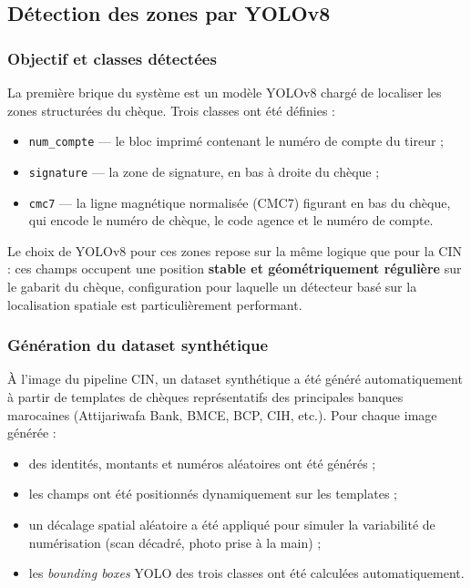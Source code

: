 \subsection*{Détection des zones par YOLOv8}

\subsubsection{Objectif et classes détectées}

La première brique du système est un modèle YOLOv8 chargé de localiser les
zones structurées du chèque. Trois classes ont été définies :

\begin{itemize}
    \item \texttt{num\_compte} — le bloc imprimé contenant le numéro de
    compte du tireur ;
    \item \texttt{signature} — la zone de signature, en bas à droite du
    chèque ;
    \item \texttt{cmc7} — la ligne magnétique normalisée (CMC7) figurant en
    bas du chèque, qui encode le numéro de chèque, le code agence et le
    numéro de compte.
\end{itemize}

Le choix de YOLOv8 pour ces zones repose sur la même logique que pour la
CIN : ces champs occupent une position \textbf{stable et géométriquement
régulière} sur le gabarit du chèque, configuration pour laquelle un
détecteur basé sur la localisation spatiale est particulièrement performant.

\subsubsection{Génération du dataset synthétique}

À l'image du pipeline CIN, un dataset synthétique a été généré
automatiquement à partir de templates de chèques représentatifs des
principales banques marocaines (Attijariwafa Bank, BMCE, BCP, CIH, etc.).
Pour chaque image générée :
\begin{itemize}
    \item des identités, montants et numéros aléatoires ont été générés ;
    \item les champs ont été positionnés dynamiquement sur les templates ;
    \item un décalage spatial aléatoire a été appliqué pour simuler la
    variabilité de numérisation (scan décadré, photo prise à la main) ;
    \item les \textit{bounding boxes} YOLO des trois classes ont été
    calculées automatiquement.
\end{itemize}


